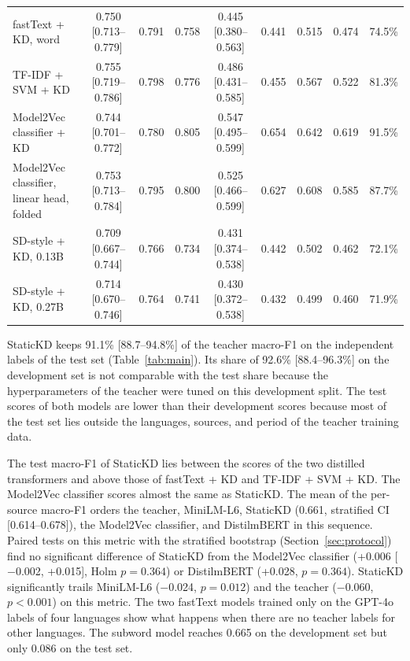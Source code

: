 \documentclass{ieeeaccess}
\begin{document}
\begin{table}[!t]
\begin{tabular}{@{}lcccccccc@{}}
fastText + KD, word & 0.750 [0.713--0.779] & 0.791 & 0.758 & 0.445 [0.380--0.563] & 0.441 & 0.515 & 0.474 & 74.5\% \\
TF-IDF + SVM + KD & 0.755 [0.719--0.786] & 0.798 & 0.776 & 0.486 [0.431--0.585] & 0.455 & 0.567 & 0.522 & 81.3\% \\
Model2Vec classifier + KD & 0.744 [0.701--0.772] & 0.780 & 0.805 & 0.547 [0.495--0.599] & 0.654 & 0.642 & 0.619 & 91.5\% \\
Model2Vec classifier, linear head, folded & 0.753 [0.713--0.784] & 0.795 & 0.800 & 0.525 [0.466--0.599] & 0.627 & 0.608 & 0.585 & 87.7\% \\
SD-style + KD, 0.13B & 0.709 [0.667--0.744] & 0.766 & 0.734 & 0.431 [0.374--0.538] & 0.442 & 0.502 & 0.462 & 72.1\% \\
SD-style + KD, 0.27B & 0.714 [0.670--0.746] & 0.764 & 0.741 & 0.430 [0.372--0.538] & 0.432 & 0.499 & 0.460 & 71.9\% \\
\bottomrule
\end{tabular}
\par\vspace{2pt}{\footnotesize Mean per source = unweighted mean of the macro-F1 on the six test-set sources. \% teacher = test macro-F1 of the model divided by that of the teacher. The frozen-embedding row and the linear-head Model2Vec row are folded three-seed ensembles like StaticKD.\par}
\end{table}
StaticKD keeps 91.1\% [88.7--94.8\%] of the teacher macro-F1 on the independent labels of the test set (Table~\ref{tab:main}). Its share of 92.6\% [88.4--96.3\%] on the development set is not comparable with the test share because the hyperparameters of the teacher were tuned on this development split. The test scores of both models are lower than their development scores because most of the test set lies outside the languages, sources, and period of the teacher training data.

The test macro-F1 of StaticKD lies between the scores of the two distilled transformers and above those of fastText + KD and TF-IDF + SVM + KD. The Model2Vec classifier scores almost the same as StaticKD. The mean of the per-source macro-F1 orders the teacher, MiniLM-L6, StaticKD (0.661, stratified CI [0.614--0.678]), the Model2Vec classifier, and DistilmBERT in this sequence. Paired tests on this metric with the stratified bootstrap (Section~\ref{sec:protocol}) find no significant difference of StaticKD from the Model2Vec classifier (+0.006 [$-$0.002, +0.015], Holm $p=0.364$) or DistilmBERT (+0.028, $p=0.364$). StaticKD significantly trails MiniLM-L6 ($-$0.024, $p=0.012$) and the teacher ($-$0.060, $p<0.001$) on this metric. The two fastText models trained only on the GPT-4o labels of four languages show what happens when there are no teacher labels for other languages. The subword model reaches 0.665 on the development set but only 0.086 on the test set.
\end{document}

